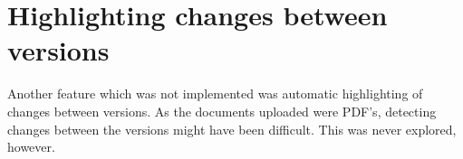 \documentclass[../../master.tex]{subfiles}
\begin{document}
\section{Highlighting changes between versions}
Another feature which was not implemented was automatic highlighting of changes between versions.
As the documents uploaded were PDF's, detecting changes between the versions might have been difficult.
This was never explored, however.
\end{document}
